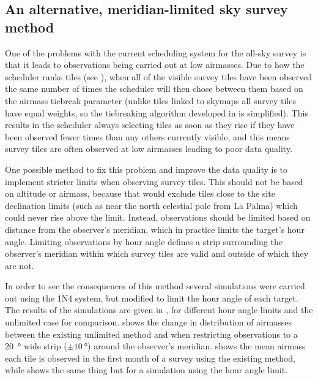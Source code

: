 \begin{colsection}
\begin{colsection}
\end{colsection}

\newpage
\subsection{An alternative, meridian-limited sky survey method}
\label{sec:survey_sim_meridian}
\begin{colsection}

One of the problems with the current scheduling system for the all-sky survey is that it leads to observations being carried out at low airmasses. Due to how the scheduler ranks tiles (see ), when all of the visible survey tiles have been observed the same number of times the scheduler will then chose between them based on the airmass tiebreak parameter (unlike tiles linked to skymaps all survey tiles have equal weights, so the tiebreaking algorithm developed in  is simplified). This results in the scheduler always selecting tiles as soon as they rise if they have been observed fewer times than any others currently visible, and this means survey tiles are often observed at low airmasses leading to poor data quality.

One possible method to fix this problem and improve the data quality is to implement stricter limits when observing survey tiles. This should not be based on altitude or airmass, because that would exclude tiles close to the site declination limits (such as near the north celestial pole from La Palma) which could never rise above the limit. Instead, observations should be limited based on distance from the observer's meridian, which in practice limits the target's hour angle. Limiting observations by hour angle defines a strip surrounding the observer's meridian within which survey tiles are valid and outside of which they are not.

In order to see the consequences of this method several simulations were carried out using the 1N4 system, but modified to limit the hour angle of each target. The results of the simulations are given in , for different hour angle limits and the unlimited case for comparison.  shows the change in distribution of airmasses between the existing unlimited method and when restricting observations to a \SI{20}{\degree} wide strip ($\pm\SI{10}{\degree}$) around the observer's meridian.  shows the mean airmass each tile is observed in the first month of a survey using the existing method, while  shows the same thing but for a simulation using the hour angle limit.


\end{colsection}
\end{colsection}
